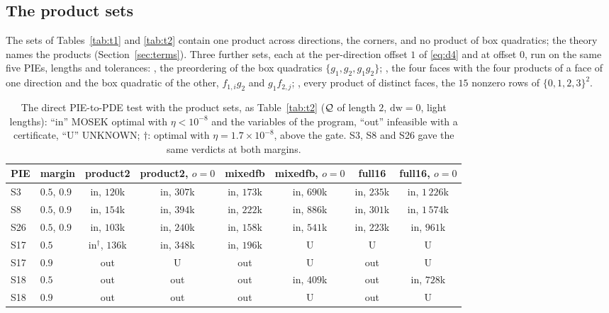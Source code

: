 \subsection{The product sets}\label{sec:t3}

The sets of Tables~\ref{tab:t1} and \ref{tab:t2} contain one product across directions, the corners, and no product of box quadratics; the theory names the products (Section~\ref{sec:terms}). Three further sets, each at the per-direction offset $1$ of \eqref{eq:d4} and at offset $0$, run on the same five PIEs, lengths and tolerances: , the preordering of the box quadratics $\{g_1,g_2,g_1g_2\}$; , the four faces with the four products of a face of one direction and the box quadratic of the other, $f_{1,i}g_2$ and $g_1f_{2,j}$; , every product of distinct faces, the $15$ nonzero rows of $\{0,1,2,3\}^2$.

\begin{table}[h]\centering\scriptsize
\setlength{\tabcolsep}{3pt}
\begin{tabular}{llcccccc}
\toprule
PIE & margin & product2 & product2, $o=0$ & mixedfb & mixedfb, $o=0$ & full16 & full16, $o=0$ \\
\midrule
S3 & $0.5$, $0.9$ & in, $120$k & in, $307$k & in, $173$k & in, $690$k & in, $235$k & in, $1\,226$k \\
S8 & $0.5$, $0.9$ & in, $154$k & in, $394$k & in, $222$k & in, $886$k & in, $301$k & in, $1\,574$k \\
S26 & $0.5$, $0.9$ & in, $103$k & in, $240$k & in, $158$k & in, $541$k & in, $223$k & in, $961$k \\
S17 & $0.5$ & in$^\dagger$, $136$k & in, $348$k & in, $196$k & U & U & U \\
S17 & $0.9$ & out & U & out & U & out & U \\
S18 & $0.5$ & out & out & out & in, $409$k & out & in, $728$k \\
S18 & $0.9$ & out & out & out & U & out & U \\
\bottomrule
\end{tabular}
\caption{The direct PIE-to-PDE test with the product sets, as Table~\ref{tab:t2} ($\mathcal{Q}$ of length $2$, $\mathrm{dw}=0$, light lengths): ``in'' MOSEK optimal with $\eta<10^{-8}$ and the variables of the program, ``out'' infeasible with a certificate, ``U'' UNKNOWN; $\dagger$: optimal with $\eta=1.7\times10^{-8}$, above the gate. S3, S8 and S26 gave the same verdicts at both margins.}\label{tab:t3}
\end{table}

